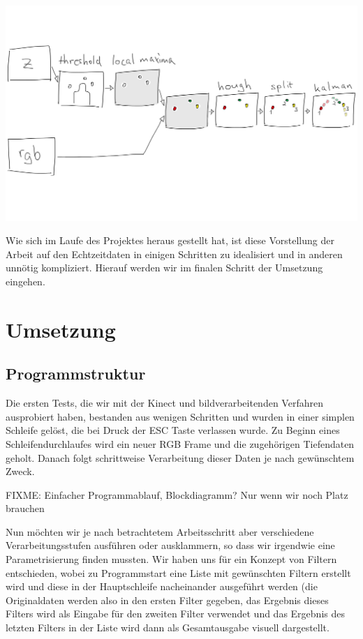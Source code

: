 \documentclass[12pt,a4paper,ngerman]{scrartcl}
\begin{document}
\includegraphics[scale=0.14]{img/processing-pipeline.png}

Wie sich im Laufe des Projektes heraus gestellt hat, ist diese Vorstellung der Arbeit 
auf den Echtzeitdaten in einigen Schritten zu idealisiert und in anderen unnötig 
kompliziert. Hierauf werden wir im finalen Schritt der Umsetzung eingehen.

\section{Umsetzung}

\subsection{Programmstruktur}

Die ersten Tests, die wir mit der Kinect und bildverarbeitenden Verfahren 
ausprobiert haben, bestanden aus wenigen Schritten und wurden in einer
simplen Schleife gelöst, die bei Druck der ESC Taste verlassen wurde. Zu Beginn
eines Schleifendurchlaufes wird ein neuer RGB Frame und die zugehörigen 
Tiefendaten geholt. Danach folgt schrittweise Verarbeitung dieser Daten je nach 
gewünschtem Zweck. 

FIXME: Einfacher Programmablauf, Blockdiagramm? Nur wenn wir noch Platz brauchen

Nun möchten wir je nach betrachtetem Arbeitsschritt aber verschiedene 
Verarbeitungsstufen ausführen oder ausklammern, so dass wir irgendwie eine
Parametrisierung finden mussten. Wir haben uns für ein Konzept von Filtern 
entschieden, wobei zu Programmstart eine Liste mit gewünschten Filtern erstellt
wird und diese in der Hauptschleife nacheinander ausgeführt werden (die Originaldaten
werden also in den ersten Filter gegeben, das Ergebnis dieses Filters wird als 
Eingabe für den zweiten Filter verwendet und das Ergebnis des letzten Filters
in der Liste wird dann als Gesamtausgabe visuell dargestellt.
\end{document}
